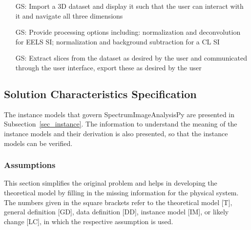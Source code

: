 \documentclass[12pt]{article}
\newcounter{goalnum} %
\newcommand{\progname}{SpectrumImageAnalysisPy} %
\begin{document}
\begin{itemize}

	\item[GS\refstepcounter{goalnum}\thegoalnum \label{G_ImportDisplay}:] Import a 3D dataset and display it such that the user can interact with it and navigate all three dimensions
	\item[GS\refstepcounter{goalnum}\thegoalnum \label{G_Processing}:] Provide processing options including: normalization and deconvolution for EELS SI; normalization and background subtraction for a CL SI
	\item[GS\refstepcounter{goalnum}\thegoalnum \label{G_Extraction}:] Extract slices from the dataset as desired by the user and communicated through the user interface, export these as desired by the user

\end{itemize}

\subsection{Solution Characteristics Specification}

The instance models that govern \progname{} are presented in
Subsection~\ref{sec_instance}.  The information to understand the meaning of the
instance models and their derivation is also presented, so that the instance
models can be verified.

\subsubsection{Assumptions}

This section simplifies the original problem and helps in developing the
theoretical model by filling in the missing information for the physical
system. The numbers given in the square brackets refer to the theoretical model
[T], general definition [GD], data definition [DD], instance model [IM], or
likely change [LC], in which the respective assumption is used.
\end{document}
